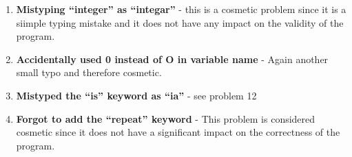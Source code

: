 \begin{enumerate}
\item \textbf{Mistyping “integer” as “integar”}  - this is a cosmetic problem since it is a siimple typing mistake and it does not have any impact on the validity of the program.
\item \textbf{ Accidentally used 0 instead of O in variable name}  - Again another small typo and therefore cosmetic.
\item \textbf{Mistyped the “is” keyword as “ia”}  - see problem 12
\item \textbf{Forgot to add the “repeat” keyword} - This problem is considered cosmetic since it does not have a significant impact on the correctness of the program.

\end{enumerate}
